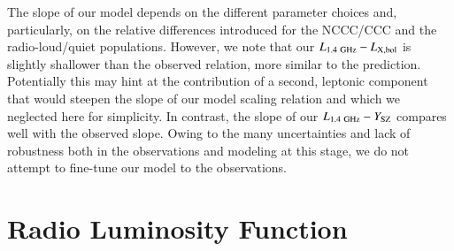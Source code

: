 \documentclass[useAMS,usenatbib]{mn2e}
\begin{document}
The slope of our model depends on the different parameter choices and,
particularly, on the relative differences introduced for the NCCC/CCC and the
radio-loud/quiet populations. However, we note that our
$L_{1.4~{\mathrm{GHz}}}-L_{{\mathrm{X,bol}}}$ is slightly shallower than the observed
relation, more similar to the \cite{2009JCAP...09..024K} prediction.
Potentially this may hint at the contribution of a second, leptonic component
that would steepen the slope of our model scaling relation and which we
neglected here for simplicity. In contrast, the slope of our
$L_{1.4~{\mathrm{GHz}}}-Y_{{\mathrm{SZ}}}$ compares well with the observed slope. Owing to
the many uncertainties and lack of robustness both in the observations and
modeling at this stage, we do not attempt to fine-tune our model to the
observations.



\section{Radio Luminosity Function}
\label{sec:5}
\end{document}
